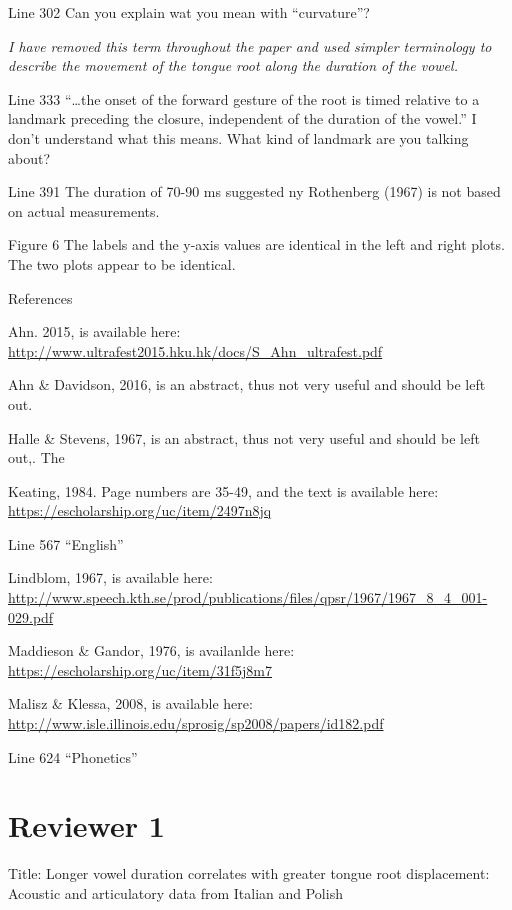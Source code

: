 \documentclass[]{article}
\begin{document}
Line 302 Can you explain wat you mean with ``curvature''?

\begin{adjustwidth}{1cm}{} \textit{
I have removed this term throughout the paper and used simpler terminology to describe the movement of the tongue root along the duration of the vowel.
} \end{adjustwidth}

Line 333 ``\ldots{}the onset of the forward gesture of the root is timed
relative to a landmark preceding the closure, independent of the
duration of the vowel.'' I don't understand what this means. What kind
of landmark are you talking about?

Line 391 The duration of 70-90 ms suggested ny Rothenberg (1967) is not
based on actual measurements.

Figure 6 The labels and the y-axis values are identical in the left and
right plots. The two plots appear to be identical.

References

Ahn. 2015, is available here:
\url{http://www.ultrafest2015.hku.hk/docs/S_Ahn_ultrafest.pdf}

Ahn \& Davidson, 2016, is an abstract, thus not very useful and should
be left out.

Halle \& Stevens, 1967, is an abstract, thus not very useful and should
be left out,. The

Keating, 1984. Page numbers are 35-49, and the text is available here:
\url{https://escholarship.org/uc/item/2497n8jq}

Line 567 ``English''

Lindblom, 1967, is available here:
\url{http://www.speech.kth.se/prod/publications/files/qpsr/1967/1967_8_4_001-029.pdf}

Maddieson \& Gandor, 1976, is availanlde here:
\url{https://escholarship.org/uc/item/31f5j8m7}

Malisz \& Klessa, 2008, is available here:
\url{http://www.isle.illinois.edu/sprosig/sp2008/papers/id182.pdf}

Line 624 ``Phonetics''

\hypertarget{reviewer-1}{%
\section{Reviewer 1}\label{reviewer-1}}

Title: Longer vowel duration correlates with greater tongue root
displacement: Acoustic and articulatory data from Italian and Polish
\end{document}
